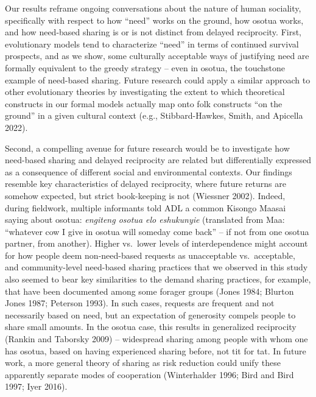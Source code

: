 \documentclass[
]{article}
\begin{document}
Our results reframe ongoing conversations about the nature of human sociality, specifically with respect to how ``need'' works on the ground, how osotua works, and how need-based sharing is or is not distinct from delayed reciprocity. First, evolutionary models tend to characterize ``need'' in terms of continued survival prospects, and as we show, some culturally acceptable ways of justifying need are formally equivalent to the greedy strategy -- even in osotua, the touchstone example of need-based sharing. Future research could apply a similar approach to other evolutionary theories by investigating the extent to which theoretical constructs in our formal models actually map onto folk constructs ``on the ground'' in a given cultural context (e.g., Stibbard-Hawkes, Smith, and Apicella 2022).

Second, a compelling avenue for future research would be to investigate how need-based sharing and delayed reciprocity are related but differentially expressed as a consequence of different social and environmental contexts. Our findings resemble key characteristics of delayed reciprocity, where future returns are somehow expected, but strict book-keeping is not (Wiessner 2002). Indeed, during fieldwork, multiple informants told ADL a common Kisongo Maasai saying about osotua: \emph{engiteng osotua elo eshukunyie} (translated from Maa: ``whatever cow I give in osotua will someday come back'' -- if not from one osotua partner, from another). Higher vs.~lower levels of interdependence might account for how people deem non-need-based requests as unacceptable vs.~acceptable, and community-level need-based sharing practices that we observed in this study also seemed to bear key similarities to the demand sharing practices, for example, that have been documented among some forager groups (Jones 1984; Blurton Jones 1987; Peterson 1993). In such cases, requests are frequent and not necessarily based on need, but an expectation of generosity compels people to share small amounts. In the osotua case, this results in generalized reciprocity (Rankin and Taborsky 2009) -- widespread sharing among people with whom one has osotua, based on having experienced sharing before, not tit for tat. In future work, a more general theory of sharing as risk reduction could unify these apparently separate modes of cooperation (Winterhalder 1996; Bird and Bird 1997; Iyer 2016).
\end{document}
